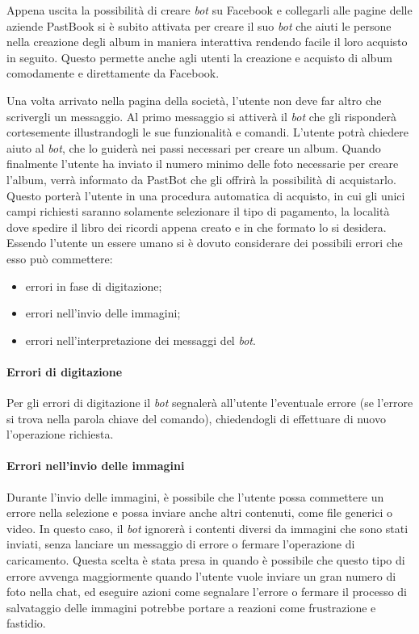 Appena uscita la possibilità di creare \textit{bot} su Facebook e collegarli
alle pagine delle aziende PastBook si è subito attivata per creare il suo
\textit{bot} che aiuti le persone nella creazione degli album in maniera
interattiva rendendo facile il loro acquisto in seguito. Questo permette anche
agli utenti la creazione e acquisto di album comodamente e direttamente da
Facebook.

Una volta arrivato nella pagina della società, l'utente non deve far altro che
scrivergli un messaggio. Al primo messaggio si attiverà il \textit{bot} che
gli risponderà cortesemente illustrandogli le sue funzionalità e comandi.
L'utente potrà chiedere aiuto al \textit{bot}, che lo guiderà nei passi
necessari per creare un album. Quando finalmente l'utente ha inviato il numero
minimo delle foto necessarie per creare l'album, verrà informato da PastBot che
gli offrirà la possibilità di acquistarlo. Questo porterà l'utente in una
procedura automatica di acquisto, in cui gli unici campi richiesti saranno
solamente selezionare il tipo di pagamento, la località dove spedire il libro
dei ricordi appena creato e in che formato lo si desidera. \\

Essendo l'utente un essere umano si è dovuto considerare dei possibili errori
che esso può commettere:
\begin{itemize}
  \item errori in fase di digitazione;
  \item errori nell'invio delle immagini;
  \item errori nell'interpretazione dei messaggi del \textit{bot}.
\end{itemize}

\paragraph*{Errori di digitazione} Per gli errori di digitazione il \textit{bot}
segnalerà all'utente l'eventuale errore (se l'errore si trova nella parola
chiave del comando), chiedendogli di effettuare di nuovo l'operazione richiesta.

\paragraph*{Errori nell'invio delle immagini} Durante l'invio delle immagini, è
possibile che l'utente possa commettere un errore nella selezione e possa
inviare anche altri contenuti, come file generici o video. In questo caso, il
\textit{bot} ignorerà i contenti diversi da immagini che sono stati inviati,
senza lanciare un messaggio di errore o fermare l'operazione di caricamento.
Questa scelta è stata presa in quando è possibile che questo tipo di errore
avvenga maggiormente quando l'utente vuole inviare un gran numero di foto nella
chat, ed eseguire azioni come segnalare l'errore o fermare il processo di
salvataggio delle immagini potrebbe portare a reazioni come frustrazione e
fastidio.

